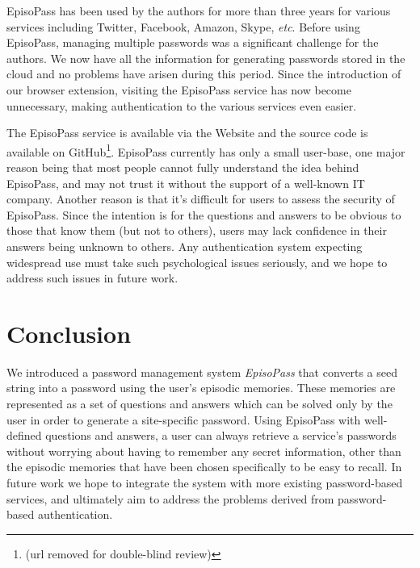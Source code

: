 \documentclass[runningheads,a4paper]{llncs}
\begin{document}
EpisoPass has been used by the authors for more than three years
for various services including Twitter, Facebook, Amazon, Skype, {\it etc}.
%
Before using EpisoPass, managing multiple passwords was a significant challenge
for the authors. We now have all the information for generating passwords 
stored in the cloud and no problems have arisen during this period.
%
Since the introduction of our browser extension, visiting the EpisoPass 
service has now become unnecessary, making authentication to the various
services even easier.

The EpisoPass service is available via the Website and the source code is
available on GitHub\footnote{
  (url removed for double-blind review)
}. EpisoPass currently has only a small user-base, one major
reason being that most people cannot fully understand the
idea behind EpisoPass, and may not trust it without the 
support of a well-known IT company.
Another reason is that it's difficult for users to
assess the security of EpisoPass.
Since the intention is for the questions and answers to be obvious
to those that know them (but not to others), users may lack
confidence in their answers being unknown to others.
Any authentication system expecting widespread use must take
such psychological issues seriously, and we hope to address 
such issues in future work.

\section{Conclusion}

We introduced a password management system {\it EpisoPass\/}
that converts a seed string into a password using the user's
episodic memories. These memories are represented as a set of questions and answers
which can be solved only by the user in order to generate a site-specific password.
%
Using EpisoPass with well-defined questions and answers,
a user can always retrieve a service's passwords without worrying about
having to remember any secret information, other than the episodic memories
that have been chosen specifically to be easy to recall.
%
In future work we hope to integrate the system with more existing password-based
services, and ultimately aim to address the problems
derived from password-based authentication.
\end{document}
